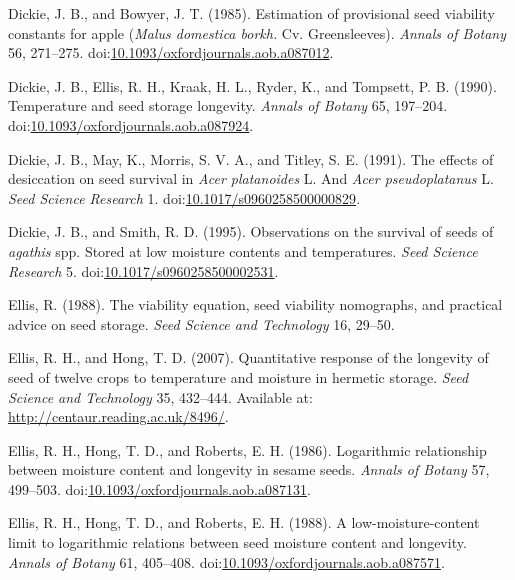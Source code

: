 \documentclass[]{article}
\begin{document}
\leavevmode\hypertarget{ref-dickie_estimation_1985}{}%
Dickie, J. B., and Bowyer, J. T. (1985). Estimation of provisional seed
viability constants for apple (\emph{Malus domestica borkh.} Cv.
Greensleeves). \emph{Annals of Botany} 56, 271--275.
doi:\href{https://doi.org/10.1093/oxfordjournals.aob.a087012}{10.1093/oxfordjournals.aob.a087012}.

\leavevmode\hypertarget{ref-dickie_temperature_1990}{}%
Dickie, J. B., Ellis, R. H., Kraak, H. L., Ryder, K., and Tompsett, P.
B. (1990). Temperature and seed storage longevity. \emph{Annals of
Botany} 65, 197--204.
doi:\href{https://doi.org/10.1093/oxfordjournals.aob.a087924}{10.1093/oxfordjournals.aob.a087924}.

\leavevmode\hypertarget{ref-dickie_effects_1991}{}%
Dickie, J. B., May, K., Morris, S. V. A., and Titley, S. E. (1991). The
effects of desiccation on seed survival in \emph{Acer platanoides} L.
And \emph{Acer pseudoplatanus} L. \emph{Seed Science Research} 1.
doi:\href{https://doi.org/10.1017/s0960258500000829}{10.1017/s0960258500000829}.

\leavevmode\hypertarget{ref-dickie_observations_1995}{}%
Dickie, J. B., and Smith, R. D. (1995). Observations on the survival of
seeds of \emph{agathis} spp. Stored at low moisture contents and
temperatures. \emph{Seed Science Research} 5.
doi:\href{https://doi.org/10.1017/s0960258500002531}{10.1017/s0960258500002531}.

\leavevmode\hypertarget{ref-ellis_viability_1988}{}%
Ellis, R. (1988). The viability equation, seed viability nomographs, and
practical advice on seed storage. \emph{Seed Science and Technology} 16,
29--50.

\leavevmode\hypertarget{ref-ellis_quantitative_2007}{}%
Ellis, R. H., and Hong, T. D. (2007). Quantitative response of the
longevity of seed of twelve crops to temperature and moisture in
hermetic storage. \emph{Seed Science and Technology} 35, 432--444.
Available at: \url{http://centaur.reading.ac.uk/8496/}.

\leavevmode\hypertarget{ref-ellis_logarithmic_1986}{}%
Ellis, R. H., Hong, T. D., and Roberts, E. H. (1986). Logarithmic
relationship between moisture content and longevity in sesame seeds.
\emph{Annals of Botany} 57, 499--503.
doi:\href{https://doi.org/10.1093/oxfordjournals.aob.a087131}{10.1093/oxfordjournals.aob.a087131}.

\leavevmode\hypertarget{ref-ellis_low-moisture-content_1988}{}%
Ellis, R. H., Hong, T. D., and Roberts, E. H. (1988). A
low-moisture-content limit to logarithmic relations between seed
moisture content and longevity. \emph{Annals of Botany} 61, 405--408.
doi:\href{https://doi.org/10.1093/oxfordjournals.aob.a087571}{10.1093/oxfordjournals.aob.a087571}.
\end{document}
